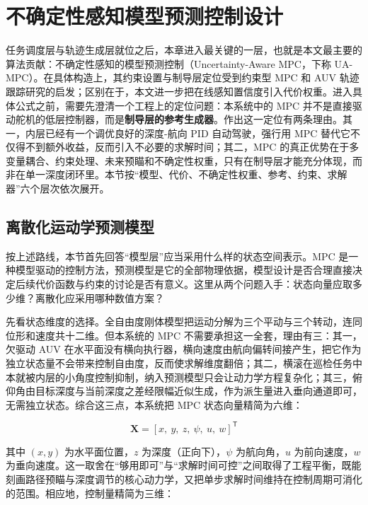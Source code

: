 \section{不确定性感知模型预测控制设计}\label{sec:ch04-4-4}

任务调度层与轨迹生成层就位之后，本章进入最关键的一层，也就是本文最主要的算法贡献：不确定性感知的模型预测控制（Uncertainty-Aware MPC，下称 UA-MPC）。在具体构造上，其约束设置与制导层定位受到约束型 MPC 和 AUV 轨迹跟踪研究的启发\cite{mayne2000constrained,li2021trajectory}；区别在于，本文进一步把在线感知置信度引入代价权重。进入具体公式之前，需要先澄清一个工程上的定位问题：本系统中的 MPC 并不是直接驱动舵机的低层控制器，而是\textbf{制导层的参考生成器}。作出这一定位有两条理由。其一，内层已经有一个调优良好的深度-航向 PID 自动驾驶，强行用 MPC 替代它不仅得不到额外收益，反而引入不必要的求解时间；其二，MPC 的真正优势在于多变量耦合、约束处理、未来预瞄和不确定性权重，只有在制导层才能充分体现，而非在单一深度闭环里。本节按``模型、代价、不确定性权重、参考、约束、求解器''六个层次依次展开。

\subsection{离散化运动学预测模型}\label{sec:ch04-4-4-1}

按上述路线，本节首先回答``模型层''应当采用什么样的状态空间表示。MPC 是一种模型驱动的控制方法，预测模型是它的全部物理依据，模型设计是否合理直接决定后续代价函数与约束的讨论是否有意义。这里从两个问题入手：状态向量应取多少维？离散化应采用哪种数值方案？

先看状态维度的选择。全自由度刚体模型把运动分解为三个平动与三个转动，连同位形和速度共十二维。但本系统的 MPC 不需要承担这一全套，理由有三：其一，欠驱动 AUV 在水平面没有横向执行器，横向速度由航向偏转间接产生，把它作为独立状态量不会带来控制自由度，反而使求解维度翻倍；其二，横滚在巡检任务中本就被内层的小角度控制抑制，纳入预测模型只会让动力学方程复杂化；其三，俯仰角由目标深度与当前深度之差经限幅近似生成，作为派生量进入垂向通道即可，无需独立状态。综合这三点，本系统把 MPC 状态向量精简为六维：

\begin{equation}
\mathbf{X} = [x,\ y,\ z,\ \psi,\ u,\ w]^{\mathsf{T}}
\label{eq:ch04-mpc-state}
\end{equation}

其中 \((x,y)\) 为水平面位置，\(z\) 为深度（正向下），\(\psi\) 为航向角，\(u\) 为前向速度，\(w\) 为垂向速度。这一取舍在``够用即可''与``求解时间可控''之间取得了工程平衡，既能刻画路径预瞄与深度调节的核心动力学，又把单步求解时间维持在控制周期可消化的范围。相应地，控制量精简为三维：

